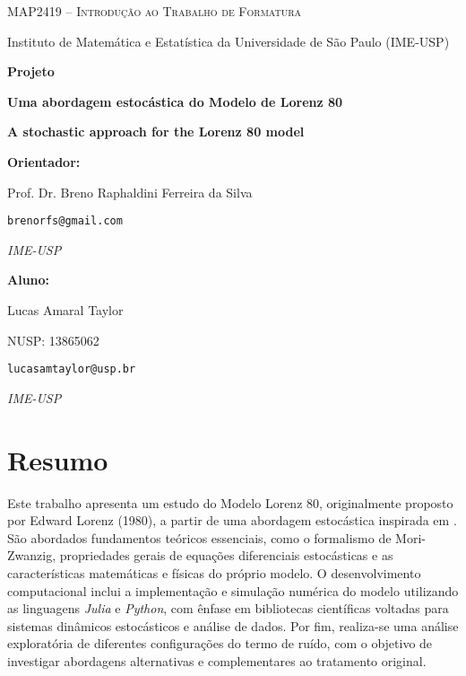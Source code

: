 \documentclass[12pt]{article}
\newenvironment{resumo}{
  \fontsize{10pt}{12pt}\selectfont  %
  \setstretch{1}                    %
  \par\noindent                     %
  \justifying                      %
}{
  \par
}
\begin{document}
\begin{titlepage}
	\centering
	{\Large\scshape MAP2419 -- Introdução ao Trabalho de Formatura \par}
	\vspace{0.3cm}
	{\large Instituto de Matemática e Estatística da Universidade de São Paulo (IME-USP)\par}
	    
	\vspace{3cm}
	    
	{\LARGE\bfseries Projeto\par}
	\vspace{1cm}
	{\LARGE\bfseries Uma abordagem estocástica do Modelo de Lorenz 80\par}
	\vspace{0.5em}
	{\large\bfseries A stochastic approach for the Lorenz 80 model\par}
	
	\vfill
	    
	\begin{minipage}[t]{0.45\textwidth}
		\raggedright
		\textbf{Orientador:} \par
		Prof. Dr. Breno Raphaldini Ferreira da Silva  \par
		\texttt{brenorfs@gmail.com} \par
		\textit{IME-USP} \par\medskip
	\end{minipage}
	\hfill
	\begin{minipage}[t]{0.45\textwidth}
		\raggedright
		\textbf{Aluno:} \par
		Lucas Amaral Taylor \par
		NUSP: 13865062 \par
		\texttt{lucasamtaylor@usp.br} \par
		\textit{IME-USP}
	\end{minipage}
	\vspace{2cm}
\end{titlepage}

\newpage
\section*{Resumo}
\begin{resumo}
    Este trabalho apresenta um estudo do Modelo Lorenz 80, originalmente proposto por Edward Lorenz (1980), a partir de uma abordagem estocástica inspirada em \citet{Chekroun2021}. São abordados fundamentos teóricos essenciais, como o formalismo de Mori-Zwanzig, propriedades gerais de equações diferenciais estocásticas e as características matemáticas e físicas do próprio modelo. O desenvolvimento computacional inclui a implementação e simulação numérica do modelo utilizando as linguagens \textit{Julia} e \textit{Python}, com ênfase em bibliotecas científicas voltadas para sistemas dinâmicos estocásticos e análise de dados. Por fim, realiza-se uma análise exploratória de diferentes configurações do termo de ruído, com o objetivo de investigar abordagens alternativas e complementares ao tratamento original.
\end{resumo}
\end{document}
